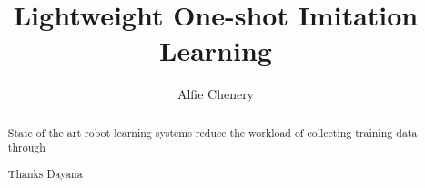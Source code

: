 \documentclass[a4paper, twoside, 12pt]{report}
\title{Lightweight One-shot Imitation Learning}
\author{Alfie Chenery}
\begin{document}


\begin{abstract}
State of the art robot learning systems reduce the workload of collecting training data through 
\end{abstract}

\renewcommand{\abstractname}{Acknowledgements}
\begin{abstract}
Thanks Dayana
\end{abstract}

\tableofcontents










\end{document}
